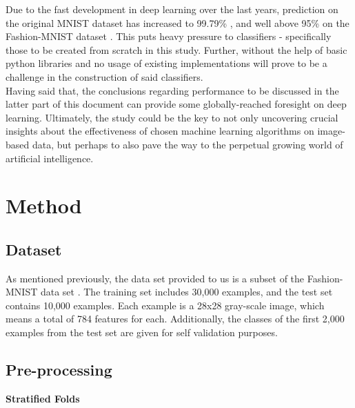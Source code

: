\documentclass[11pt,a4paper]{article}
\begin{document}
\noindent Due to the fast development in deep learning over the last years, prediction on the original MNIST dataset has increased to 99.79\% \cite{xiao2017/online}, and well above 95\% on the Fashion-MNIST dataset \cite{web:fashion_mnist}. This puts heavy pressure to classifiers - specifically those to be created from scratch in this study. Further, without the help of basic python libraries and no usage of existing implementations will prove to be a challenge in the construction of said classifiers.\\

\noindent Having said that, the conclusions regarding performance to be discussed in the latter part of this document can provide some globally-reached foresight on deep learning. Ultimately, the study could be the key to not only uncovering crucial insights about the effectiveness of chosen machine learning algorithms on image-based data, but perhaps to also pave the way to the perpetual growing world of artificial intelligence.

\pagebreak



\section*{Method}
\subsection*{Dataset}

\noindent As mentioned previously, the data set provided to us is a subset of the Fashion-MNIST data set \cite{web:fashion_mnist}. The training set includes 30,000 examples, and the test set contains 10,000 examples. Each example is a 28x28 gray-scale image, which means a total of 784 features for each. Additionally, the classes of the first 2,000 examples from the test set are given for self validation purposes.



\subsection*{Pre-processing}
\noindent
\textbf{Stratified Folds}\\
\end{document}
